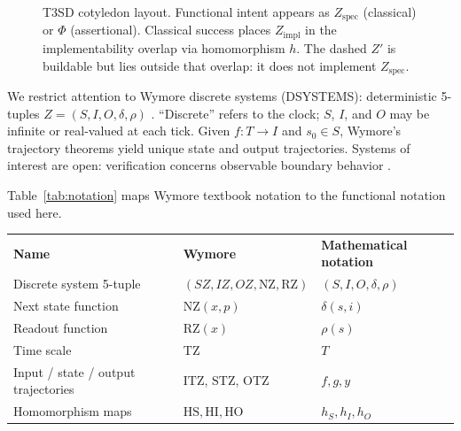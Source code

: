 \begin{figure}[t]
{%
  }
  \caption{T3SD cotyledon layout. Functional intent appears as $Z_{\text{spec}}$ (classical) or $\Phi$ (assertional). Classical success places $Z_{\text{impl}}$ in the implementability overlap via homomorphism $h$. The dashed $Z'$ is buildable but lies outside that overlap: it does not implement $Z_{\text{spec}}$.}
  \label{fig:t3sd-cotyledons}
\end{figure}

We restrict attention to Wymore discrete systems (DSYSTEMS): deterministic 5-tuples $Z=(S,I,O,\delta,\rho)$ \citep{Wymore1993}. ``Discrete'' refers to the clock; $S$, $I$, and $O$ may be infinite or real-valued at each tick. Given $f:T\to I$ and $s_0\in S$, Wymore's trajectory theorems yield unique state and output trajectories. Systems of interest are open: verification concerns observable boundary behavior \citep{salado2019mbse}.

Table~\ref{tab:notation} maps Wymore textbook notation \citep{Wymore1993} to the functional notation used here.

\begingroup
\renewcommand{\arraystretch}{1.4}
\footnotesize
\begin{tabularx}{\textwidth}{@{}A{0.20\textwidth} A{0.32\textwidth} >{\raggedright\arraybackslash}X@{}}
    \headingfont\bfseries Name & \headingfont\bfseries Wymore & \headingfont\bfseries Mathematical notation \\
    \addlinespace[3pt]
    Discrete system 5-tuple & $(SZ, IZ, OZ, \text{NZ}, \text{RZ})$ & $(S, I, O, \delta, \rho)$ \\
    Next state function & $\text{NZ}(x, p)$ & $\delta(s, i)$ \\
    Readout function & $\text{RZ}(x)$ & $\rho(s)$ \\
    Time scale & $\text{TZ}$ & $T$ \\
    Input / state / output trajectories & $\text{ITZ}$, $\text{STZ}$, $\text{OTZ}$ & $f,g,y$ \\
    Homomorphism maps & $\text{HS}, \text{HI}, \text{HO}$ & $h_S, h_I, h_O$ \\
\end{tabularx}
\label{tab:notation}
\endgroup
\vspace{4pt}

